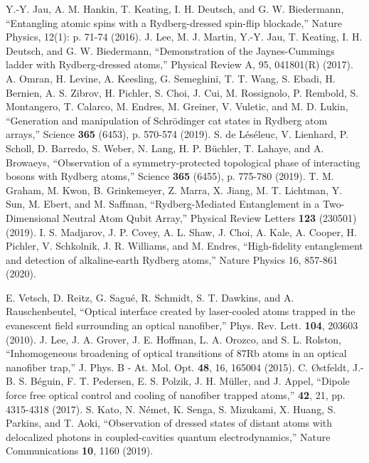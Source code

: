 \documentclass{osa-article}
\begin{document}
\begin{thebibliography}{99}
 Y.-Y. Jau, A. M. Hankin, T. Keating, I. H. Deutsch, and G. W. Biedermann, ``Entangling atomic spins with a Rydberg-dressed spin-flip blockade,'' Nature Physics, 12(1): p. 71-74 (2016).
 J. Lee, M. J. Martin, Y.-Y. Jau, T. Keating, I. H. Deutsch, and G. W. Biedermann, ``Demonstration of the Jaynes-Cummings ladder with Rydberg-dressed atoms,'' Physical Review A, 95, 041801(R) (2017).
 A. Omran, H. Levine, A. Keesling, G. Semeghini, T. T. Wang, S. Ebadi, H. Bernien, A. S. Zibrov, H. Pichler, S. Choi, J. Cui, M. Rossignolo, P. Rembold, S. Montangero, T. Calarco, M. Endres, M. Greiner, V. Vuletic, and M. D. Lukin, {}``Generation and manipulation of Schr{\"o}dinger cat states in Rydberg atom arrays,'' Science \textbf{365} (6453), p. 570-574 (2019).
 S. de L{\'e}s{\'e}leuc, V. Lienhard, P. Scholl, D. Barredo, S. Weber, N. Lang, H. P. B{\"u}chler, T. Lahaye, and A. Browaeys, {}``Observation of a symmetry-protected topological phase of interacting bosons with Rydberg atoms,'' Science \textbf{365} (6455), p. 775-780 (2019).
 T. M. Graham, M. Kwon, B. Grinkemeyer, Z. Marra, X. Jiang, M. T. Lichtman, Y. Sun, M. Ebert, and M. Saffman, {}``Rydberg-Mediated Entanglement in a Two-Dimensional Neutral Atom Qubit Array,'' Physical Review Letters \textbf{123} (230501) (2019).
 I. S. Madjarov, J. P. Covey, A. L. Shaw, J. Choi, A. Kale, A. Cooper, H. Pichler, V. Schkolnik, J. R. Williams, and M. Endres, {} ``High-fidelity entanglement and detection of alkaline-earth Rydberg atoms,'' Nature Physics 16, 857-861 (2020).

 E. Vetsch, D. Reitz, G. Sagu{\'e}, R. Schmidt, S. T. Dawkins, and A. Rauschenbeutel, {} ``Optical interface created by laser-cooled atoms trapped in the evanescent field surrounding an optical nanofiber,'' Phys. Rev. Lett. \textbf{104}, 203603 (2010).
 J. Lee, J. A. Grover, J. E. Hoffman, L. A. Orozco, and S. L. Rolston, {} ``Inhomogeneous broadening of optical transitions of 87Rb atoms in an optical nanofiber trap,''  J. Phys. B - At. Mol. Opt. \textbf{48}, 16, 165004 (2015).
 C. {\O}stfeldt, J.-B. S. B{\'e}guin, F. T. Pedersen, E. S. Polzik, J. H. M{\"u}ller, and J. Appel, ``Dipole force free optical control and cooling of nanofiber trapped atoms,'' \textbf{42}, 21, pp. 4315-4318 (2017). 
 S. Kato, N. N{\'e}met, K. Senga, S. Mizukami, X. Huang, S. Parkins, and T. Aoki, {} ``Observation of dressed states of distant atoms with delocalized photons in coupled-cavities quantum electrodynamics,'' Nature Communications \textbf{10}, 1160 (2019). 


\end{thebibliography}
\end{document}
